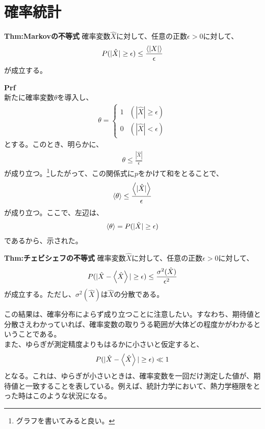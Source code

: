 \documentclass[a4paper,11pt]{jsarticle}
\numberwithin{equation}{section}
\begin{document}
\section{確率統計}
\begin{itembox}[l]{\textbf{Thm:Markovの不等式}}
  確率変数$\hat{X}$に対して、任意の正数$\epsilon > 0$に対して、
  \begin{align}
    P(|\hat{X} | \geq \epsilon) \leq \frac{\expval{|X|}}{\epsilon}
  \end{align}
  が成立する。

\end{itembox}
\textbf{Prf}\\
新たに確率変数$\theta$を導入し、
\begin{align}
  \theta = \begin{cases}
    1 & (|\hat{X}| \geq \epsilon)\\
    0 & (|\hat{X}| < \epsilon)
  \end{cases}
\end{align}
とする。このとき、明らかに、
\begin{align}
  \theta \leq \frac{|\hat{X}|}{\epsilon}
\end{align}
が成り立つ。\footnote{グラフを書いてみると良い。}したがって、この関係式に$p$をかけて和をとることで、
\begin{align}
  \ev{\theta} \leq \frac{\expval{|\hat{X}|}}{\epsilon}
\end{align}
が成り立つ。ここで、左辺は、
\begin{align}
  \ev{\theta} = P(|\hat{X} | \geq \epsilon)
\end{align}
であるから、示された。\hfill\qedsymbol\\


\begin{itembox}[l]{\textbf{Thm:チェビシェフの不等式}}
  確率変数$\hat{X}$に対して、任意の正数$\epsilon > 0$に対して、
  \begin{align}
    P(|\hat{X} - \expval{\hat{X}}| \geq \epsilon) \leq \frac{\sigma^2(\hat{X})}{\epsilon^2}
  \end{align}
  が成立する。ただし、$\sigma^2(\hat{X})$は$\hat{X}$の分散である。

\end{itembox}
この結果は、確率分布によらず成り立つことに注意したい。すなわち、期待値と分散さえわかっていれば、確率変数の取りうる範囲が大体どの程度かがわかるということである。\\
また、ゆらぎが測定精度よりもはるかに小さいと仮定すると、
\begin{align}
  P(|\hat{X} - \expval{\hat{X}}| \geq \epsilon) \ll 1
\end{align}
となる。これは、ゆらぎが小さいときは、確率変数を一回だけ測定した値が、期待値と一致することを表している。例えば、統計力学において、熱力学極限をとった時はこのような状況になる。\\
\end{document}
